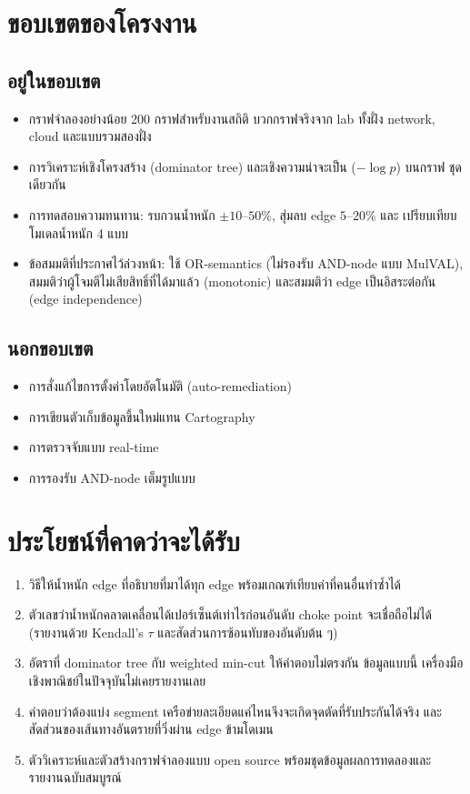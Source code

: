 \section{ขอบเขตของโครงงาน}\label{sec:intro-scope}

\subsection{อยู่ในขอบเขต}
\begin{itemize}[leftmargin=1.6em]
\item กราฟจำลองอย่างน้อย 200 กราฟสำหรับงานสถิติ บวกกราฟจริงจาก lab ทั้งฝั่ง network,
cloud และแบบรวมสองฝั่ง
\item การวิเคราะห์เชิงโครงสร้าง (dominator tree) และเชิงความน่าจะเป็น ($-\log p$) บนกราฟ
ชุดเดียวกัน
\item การทดสอบความทนทาน: รบกวนน้ำหนัก $\pm 10$--$50\%$, สุ่มลบ edge $5$--$20\%$ และ
เปรียบเทียบโมเดลน้ำหนัก 4 แบบ
\item ข้อสมมติที่ประกาศไว้ล่วงหน้า: ใช้ OR-semantics (ไม่รองรับ AND-node แบบ MulVAL),
สมมติว่าผู้โจมตีไม่เสียสิทธิ์ที่ได้มาแล้ว (monotonic) และสมมติว่า edge เป็นอิสระต่อกัน
(edge independence)
\end{itemize}

\subsection{นอกขอบเขต}
\begin{itemize}[leftmargin=1.6em]
\item การสั่งแก้ไขการตั้งค่าโดยอัตโนมัติ (auto-remediation)
\item การเขียนตัวเก็บข้อมูลขึ้นใหม่แทน Cartography
\item การตรวจจับแบบ real-time
\item การรองรับ AND-node เต็มรูปแบบ
\end{itemize}

\section{ประโยชน์ที่คาดว่าจะได้รับ}\label{sec:intro-benefits}

\begin{enumerate}[leftmargin=1.6em]
\item วิธีให้น้ำหนัก edge ที่อธิบายที่มาได้ทุก edge พร้อมเกณฑ์เทียบค่าที่คนอื่นทำซ้ำได้
\item ตัวเลขว่าน้ำหนักคลาดเคลื่อนได้เปอร์เซ็นต์เท่าไรก่อนอันดับ choke point จะเชื่อถือไม่ได้
(รายงานด้วย Kendall's $\tau$ และสัดส่วนการซ้อนทับของอันดับต้น ๆ)
\item อัตราที่ dominator tree กับ weighted min-cut ให้คำตอบไม่ตรงกัน ข้อมูลแบบนี้
เครื่องมือเชิงพาณิชย์ในปัจจุบันไม่เคยรายงานเลย
\item คำตอบว่าต้องแบ่ง segment เครือข่ายละเอียดแค่ไหนจึงจะเกิดจุดตัดที่รับประกันได้จริง
และสัดส่วนของเส้นทางอันตรายที่วิ่งผ่าน edge ข้ามโดเมน
\item ตัววิเคราะห์และตัวสร้างกราฟจำลองแบบ open source พร้อมชุดข้อมูลผลการทดลองและ
รายงานฉบับสมบูรณ์
\end{enumerate}
